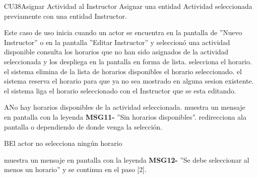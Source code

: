 \begin{UseCase}{CU38}{Asignar Actividad al Instructor}{
	Asignar una entidad Actividad seleccionada previamente con una entidad Instructor.
	}
	
\end{UseCase}
\begin{UCtrayectoria}{Este caso de uso inicia cuando un actor se encuentra en la pantalla de ''Nuevo Instructor'' o en la pantalla ''Editar Instructor'' y seleccionó una actividad disponible}
	\UCpaso consulta los horarios que no han sido asignados de la actividad seleccionada y los despliega en la pantalla en forma de lista.
	\UCpaso[\UCactor] selecciona el horario.
	\UCpaso el sistema elimina de la lista de horarios disponibles el horario seleccionado.
	\UCpaso el sistema reserva el horario para que ya no sea mostrado en alguna sesion existente.
	\UCpaso el sistema liga el horario seleccionado con el Instructor que se esta editando.
\end{UCtrayectoria}

\begin{UCtrayectoriaA}{A}{No hay horarios disponibles de la actividad seleccionada.}
	\UCpaso muestra un mensaje en pantalla con la leyenda {\bf MSG11-} ''Sin horarios disponibles''.
	\UCpaso redirecciona ala pantalla  o   dependiendo de donde venga la selección.
\end{UCtrayectoriaA}
\begin{UCtrayectoriaA}{B}{El actor no selecciona ningún horario}

	\UCpaso muestra un mensaje en pantalla con la leyenda {\bf MSG12-} ''Se debe seleccionar al menos un horario'' y se continua en el paso [2].
\end{UCtrayectoriaA}


